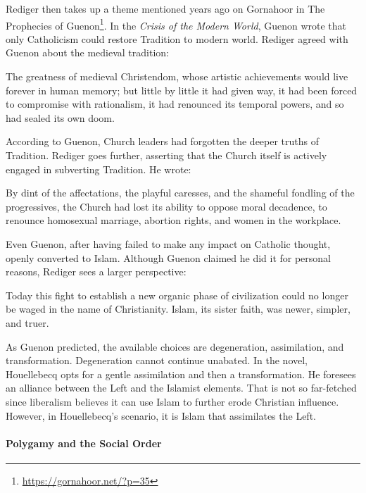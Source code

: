 Rediger then takes up a theme mentioned years ago on Gornahoor in The Prophecies of Guenon\footnote{\url{https://gornahoor.net/?p=35}}. In the \emph{Crisis of the Modern World}, Guenon wrote that only Catholicism could restore Tradition to modern world. Rediger agreed with Guenon about the medieval tradition:

\begin{quotex}
The greatness of medieval Christendom, whose artistic achievements would live forever in human memory; but little by little it had given way, it had been forced to compromise with rationalism, it had renounced its temporal powers, and so had sealed its own doom.
\end{quotex}


According to Guenon, Church leaders had forgotten the deeper truths of Tradition. Rediger goes further, asserting that the Church itself is actively engaged in subverting Tradition. He wrote:

\begin{quotex}
By dint of the affectations, the playful caresses, and the shameful fondling of the progressives, the Church had lost its ability to oppose moral decadence, to renounce homosexual marriage, abortion rights, and women in the workplace.
\end{quotex}


Even Guenon, after having failed to make any impact on Catholic thought, openly converted to Islam. Although Guenon claimed he did it for personal reasons, Rediger sees a larger perspective:

\begin{quotex}
Today this fight to establish a new organic phase of civilization could no longer be waged in the name of Christianity. Islam, its sister faith, was newer, simpler, and truer.
\end{quotex}


As Guenon predicted, the available choices are degeneration, assimilation, and transformation. Degeneration cannot continue unabated. In the novel, Houellebecq opts for a gentle assimilation and then a transformation. He foresees an alliance between the Left and the Islamist elements. That is not so far-fetched since liberalism believes it can use Islam to further erode Christian influence. However, in Houellebecq's scenario, it is Islam that assimilates the Left.

\paragraph{Polygamy and the Social Order}


